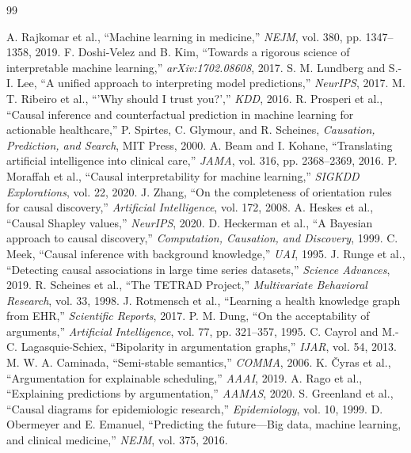 \documentclass[conference, a4paper]{IEEEtran}
\begin{document}
\begin{thebibliography}{99}

 A. Rajkomar et al., ``Machine learning in medicine,'' \textit{NEJM}, vol. 380, pp. 1347–1358, 2019.
 F. Doshi-Velez and B. Kim, ``Towards a rigorous science of interpretable machine learning,'' \textit{arXiv:1702.08608}, 2017.
 S. M. Lundberg and S.-I. Lee, ``A unified approach to interpreting model predictions,'' \textit{NeurIPS}, 2017.
 M. T. Ribeiro et al., ``'Why should I trust you?','' \textit{KDD}, 2016.
 R. Prosperi et al., ``Causal inference and counterfactual prediction in machine learning for actionable healthcare,'' 
 P. Spirtes, C. Glymour, and R. Scheines, \textit{Causation, Prediction, and Search}, MIT Press, 2000.
 A. Beam and I. Kohane, ``Translating artificial intelligence into clinical care,'' \textit{JAMA}, vol. 316, pp. 2368–2369, 2016.
 P. Moraffah et al., ``Causal interpretability for machine learning,'' \textit{SIGKDD Explorations}, vol. 22, 2020.
 J. Zhang, ``On the completeness of orientation rules for causal discovery,'' \textit{Artificial Intelligence}, vol. 172, 2008.
 A. Heskes et al., ``Causal Shapley values,'' \textit{NeurIPS}, 2020.
 D. Heckerman et al., ``A Bayesian approach to causal discovery,'' \textit{Computation, Causation, and Discovery}, 1999.
 C. Meek, ``Causal inference with background knowledge,'' \textit{UAI}, 1995.
 J. Runge et al., ``Detecting causal associations in large time series datasets,'' \textit{Science Advances}, 2019.
 R. Scheines et al., ``The TETRAD Project,'' \textit{Multivariate Behavioral Research}, vol. 33, 1998.
 J. Rotmensch et al., ``Learning a health knowledge graph from EHR,'' \textit{Scientific Reports}, 2017.
 P. M. Dung, ``On the acceptability of arguments,'' \textit{Artificial Intelligence}, vol. 77, pp. 321–357, 1995.
 C. Cayrol and M.-C. Lagasquie-Schiex, ``Bipolarity in argumentation graphs,'' \textit{IJAR}, vol. 54, 2013.
 M. W. A. Caminada, ``Semi-stable semantics,'' \textit{COMMA}, 2006.
 K. \v{C}yras et al., ``Argumentation for explainable scheduling,'' \textit{AAAI}, 2019.
 A. Rago et al., ``Explaining predictions by argumentation,'' \textit{AAMAS}, 2020.
 S. Greenland et al., ``Causal diagrams for epidemiologic research,'' \textit{Epidemiology}, vol. 10, 1999.
 D. Obermeyer and E. Emanuel, ``Predicting the future—Big data, machine learning, and clinical medicine,'' \textit{NEJM}, vol. 375, 2016.

\end{thebibliography}
\end{document}
